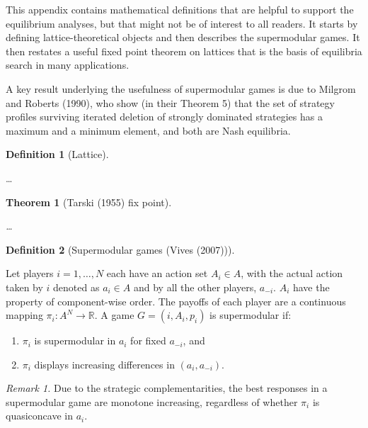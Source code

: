 \documentclass[
]{article}
\theoremstyle{definition}
\newtheorem{definition}{Definition}[section]
\theoremstyle{plain}
\newtheorem{theorem}{Theorem}[section]
\theoremstyle{remark}
\begin{document}
This appendix contains mathematical definitions that are helpful to
support the equilibrium analyses, but that might not be of interest to
all readers. It starts by defining lattice-theoretical objects and then
describes the supermodular games. It then restates a useful fixed point
theorem on lattices that is the basis of equilibria search in many
applications.

A key result underlying the usefulness of supermodular games is due to
Milgrom and Roberts (1990), who show (in their Theorem 5) that the set
of strategy profiles surviving iterated deletion of strongly dominated
strategies has a maximum and a minimum element, and both are Nash
equilibria.

\begin{definition}[Lattice]\protect\hypertarget{def-lattice}{}\label{def-lattice}

\ldots{}

\end{definition}

\begin{theorem}[Tarski (1955) fix
point]\protect\hypertarget{thm-fixedpoint}{}\label{thm-fixedpoint}

\ldots{}

\end{theorem}

\begin{definition}[Supermodular games (Vives
(2007))]\protect\hypertarget{def-supermodular}{}\label{def-supermodular}

Let players \(i= 1, \dots, N\) each have an action set \(A_i \in A\),
with the actual action taken by \(i\) denoted as \(a_i \in A\) and by
all the other players, \(a_{-i}\). \(A_i\) have the property of
component-wise order. The payoffs of each player are a continuous
mapping \(\pi_i : A^N \to \mathbb{R}\). A game \(G = (i, A_i, p_i)\) is
supermodular if:

\begin{enumerate}
\def\labelenumi{\arabic{enumi}.}
\item
  \(\pi_i\) is supermodular in \(a_i\) for fixed \(a_{-i}\), and
\item
  \(\pi_i\) displays increasing differences in \((a_i, a_{-i})\).
\end{enumerate}

\emph{Remark 1.} Due to the strategic complementarities, the best
responses in a supermodular game are monotone increasing, regardless of
whether \(\pi_i\) is quasiconcave in \(a_i\).

\end{definition}
\end{document}
